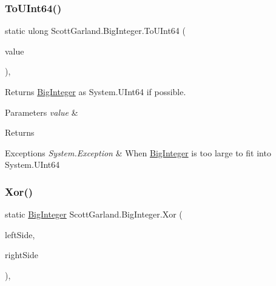 \subsubsection{\texorpdfstring{To\+U\+Int64()}{ToUInt64()}}
{\footnotesize\ttfamily static ulong Scott\+Garland.\+Big\+Integer.\+To\+U\+Int64 (\begin{DoxyParamCaption}\item[{\hyperlink{class_scott_garland_1_1_big_integer}{Big\+Integer}}]{value }\end{DoxyParamCaption})\hspace{0.3cm}{\ttfamily [inline]}, {\ttfamily [static]}}



Returns \hyperlink{class_scott_garland_1_1_big_integer}{Big\+Integer} as System.\+U\+Int64 if possible. 


\begin{DoxyParams}{Parameters}
{\em value} & \\
\hline
\end{DoxyParams}
\begin{DoxyReturn}{Returns}

\end{DoxyReturn}

\begin{DoxyExceptions}{Exceptions}
{\em System.\+Exception} & When \hyperlink{class_scott_garland_1_1_big_integer}{Big\+Integer} is too large to fit into System.\+U\+Int64\\
\hline
\end{DoxyExceptions}
\mbox{\label{class_scott_garland_1_1_big_integer_a161209fa83f1b81fac13a0256b07c80e}} 
\subsubsection{\texorpdfstring{Xor()}{Xor()}}
{\footnotesize\ttfamily static \hyperlink{class_scott_garland_1_1_big_integer}{Big\+Integer} Scott\+Garland.\+Big\+Integer.\+Xor (\begin{DoxyParamCaption}\item[{\hyperlink{class_scott_garland_1_1_big_integer}{Big\+Integer}}]{left\+Side,  }\item[{\hyperlink{class_scott_garland_1_1_big_integer}{Big\+Integer}}]{right\+Side }\end{DoxyParamCaption})\hspace{0.3cm}{\ttfamily [inline]}, {\ttfamily [static]}}



